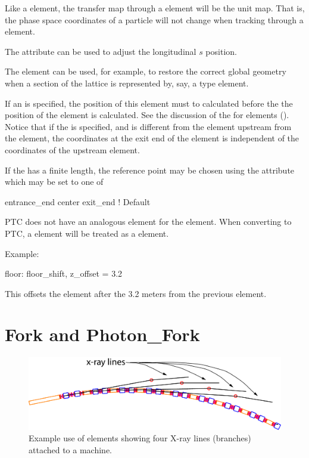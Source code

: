 Like a  element, the transfer map through a  element will be the
unit map. That is, the phase space coordinates of a particle will not change when tracking through a
 element. 

The  attribute can be used to adjust the longitudinal $s$ position.

The  element can be used, for example, to restore the
correct global geometry when a section of the lattice is represented by, say,
a  type element.

If an  is specified, the position of this element must to calculated before the the
position of the  element is calculated. See the discussion of the  for
 elements ().  Notice that if the  is specified, and is
different from the element upstream from the  element, the coordinates at the exit
end of the  element is independent of the coordinates of the upstream element.

If the  has a finite length, the reference point may be chosen using the
 attribute which may be set to one of
\begin{example}
  entrance_end
  center
  exit_end         ! Default
\end{example}


PTC does not have an analogous element for the 
element. When converting to PTC, a  element will be treated
as a  element.

Example: 
\begin{example}
  floor: floor_shift, z_offset = 3.2
\end{example}
This offsets the element after the  3.2 meters from the previous
element.

\section{Fork and Photon_Fork}
\label{s:fork}

\begin{figure}[tb]
  \centering
  \includegraphics[width=5in]{x-fork.pdf}
  \caption[Example with photon_fork elements.]
  {
Example use of  elements showing four X-ray lines (branches)
attached to a machine.
  }
  \label{f:x.fork}
\end{figure}

